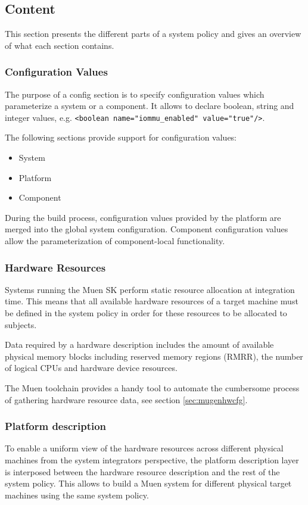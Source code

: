 \documentclass[a4paper,twoside,titlepage]{article}
\begin{document}
\subsection{Content}
This section presents the different parts of a system policy and gives an
overview of what each section contains.

\subsubsection{Configuration Values}
The purpose of a config section is to specify configuration values which
parameterize a system or a component. It allows to declare boolean, string and
integer values, e.g. \texttt{<boolean name="iommu\_enabled" value="true"/>}.

The following sections provide support for configuration values:
\begin{itemize}
	\item System
	\item Platform
	\item Component
\end{itemize}

During the build process, configuration values provided by the platform are
merged into the global system configuration. Component configuration values
allow the parameterization of component-local functionality.

\subsubsection{Hardware Resources}
Systems running the Muen SK perform static resource allocation at integration
time. This means that all available hardware resources of a target machine must
be defined in the system policy in order for these resources to be allocated to
subjects.

Data required by a hardware description includes the amount of available
physical memory blocks including reserved memory regions (RMRR), the number of
logical CPUs and hardware device resources.

The Muen toolchain provides a handy tool to automate the cumbersome process of
gathering hardware resource data, see section \ref{sec:mugenhwcfg}.

\subsubsection{Platform description}
To enable a uniform view of the hardware resources across different physical
machines from the system integrators perspective, the platform description layer
is interposed between the hardware resource description and the rest of the
system policy. This allows to build a Muen system for different physical target
machines using the same system policy.
\end{document}

